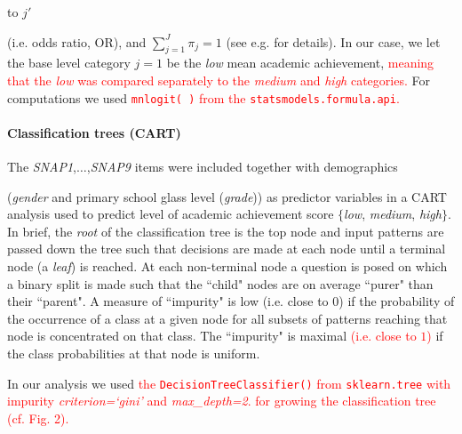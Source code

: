 \documentclass[10pt,letterpaper]{article}
\begin{document}
to $j'$ {(i.e. odds ratio, OR), and $\sum_{j=1}^J \pi_j = 1$ (see e.g. \cite{Bilder2015} for details).
In our case, we let the base level category $j=1$ be the {\it low} mean academic achievement, \textcolor{red}{meaning that the {\it low} was compared separately to 
the {\it medium} and {\it high} categories.}
For computations we used  \textcolor{red}{{\tt \small mnlogit( )} from the {\tt \small statsmodels.formula.api}.} \\

\vspace{3mm}

\paragraph{Classification trees (CART)}
The {\it SNAP1},$\ldots$,{\it SNAP9} items were included together with demographics {(\emph{gender} and primary school glass level ({\it grade})) as predictor variables in a CART analysis \cite{Breiman2001} used to predict level of academic achievement score $\{$\emph{low}, \emph{medium}, \emph{high}$\}$.
In brief, the \emph{root} of the classification tree is the top node and input patterns are passed down the tree such that decisions are made at each node until a terminal 
node (a \emph{leaf}) is reached. At each non-terminal node a question is posed on which a binary split is made such that the ``child" nodes are on average ``purer" than their ``parent". 
A measure of ``impurity" is 
low (i.e. close to $0$) if the probability of the occurrence of a class at a given node for all subsets of patterns reaching that node is concentrated on that class. 
The ``impurity" is maximal \textcolor{red}{(i.e. close to $1$)} if the class probabilities at that node is uniform. 
         
In our analysis we used \textcolor{red}{the {\tt \small DecisionTreeClassifier()}  from {\tt \small sklearn.tree} with impurity {\it criterion=`gini'} and {\it max\_depth=2}.
for growing the classification tree (cf. Fig. 2).}

}}
\end{document}
